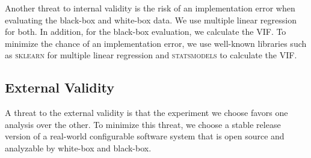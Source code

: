 Another threat to internal validity is the risk of an implementation error when evaluating the black-box and white-box data.
We use multiple linear regression for both. In addition, for the black-box evaluation, we calculate the \acs{VIF}.
To minimize the chance of an implementation error, we use well-known libraries such as \textsc{sklearn} for multiple linear regression and 
\textsc{statsmodels} to calculate the \acs{VIF}.

\subsection*{External Validity}
A threat to the external validity is that the experiment we choose favors one analysis over the other.
To minimize this threat, we choose a stable release version of a real-world configurable software system that is open source and analyzable 
by white-box and black-box.